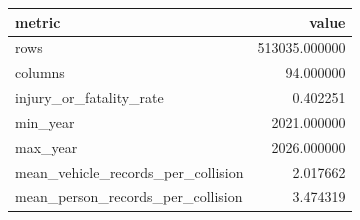 \begin{tabular}{lr}
\toprule
metric & value \\
\midrule
rows & 513035.000000 \\
columns & 94.000000 \\
injury_or_fatality_rate & 0.402251 \\
min_year & 2021.000000 \\
max_year & 2026.000000 \\
mean_vehicle_records_per_collision & 2.017662 \\
mean_person_records_per_collision & 3.474319 \\
\bottomrule
\end{tabular}

